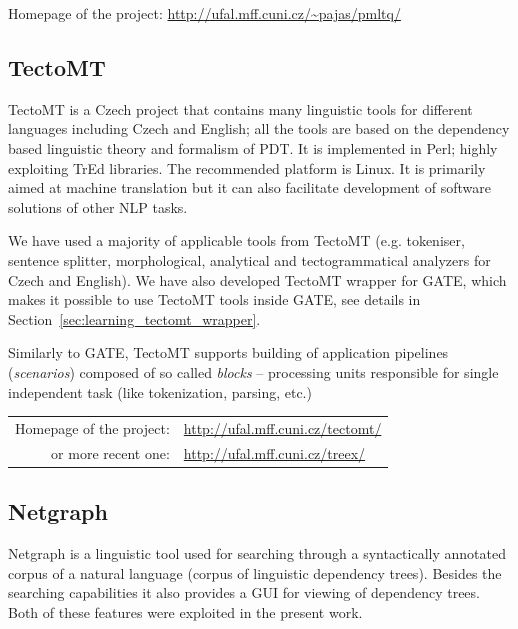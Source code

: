 \medskip
Homepage of the project: \url{http://ufal.mff.cuni.cz/~pajas/pmltq/}



\subsection{TectoMT} \label{sec:third_tectomt}

TectoMT \citep{biblio:ZaPtTectoMTHighly2008} is a Czech project that contains many linguistic tools for different languages including Czech and English; all the tools are based on the dependency based linguistic theory and formalism of PDT. It is implemented in Perl; highly exploiting TrEd libraries. The recommended platform is Linux. %
It is primarily aimed at machine translation but it can also facilitate development of software solutions of other NLP tasks.

We have used a majority of applicable tools from TectoMT (e.g. tokeniser, sentence splitter, morphological, analytical and tectogrammatical analyzers for Czech and English). We have also developed TectoMT wrapper for GATE, which makes it possible to use TectoMT tools inside GATE, see details in Section~\ref{sec:learning_tectomt_wrapper}.

Similarly to GATE, TectoMT supports building of application pipelines (\emph{scenarios}) composed of so called \emph{blocks} -- processing units responsible for single independent task (like tokenization, parsing, etc.)

\medskip
\begin{tabular}{rl}
Homepage of the project:&\url{http://ufal.mff.cuni.cz/tectomt/}\\
or more recent one:& \url{http://ufal.mff.cuni.cz/treex/}\\
\end{tabular}


\subsection{Netgraph} \label{sec:third_netgraph}

Netgraph \citep{biblio:MiNetgraphA2006} is a linguistic tool used for searching through a syntactically annotated corpus of a natural language (corpus of linguistic dependency trees). Besides the searching capabilities it also provides a GUI for viewing of dependency trees. Both of these features were exploited in the present work.

